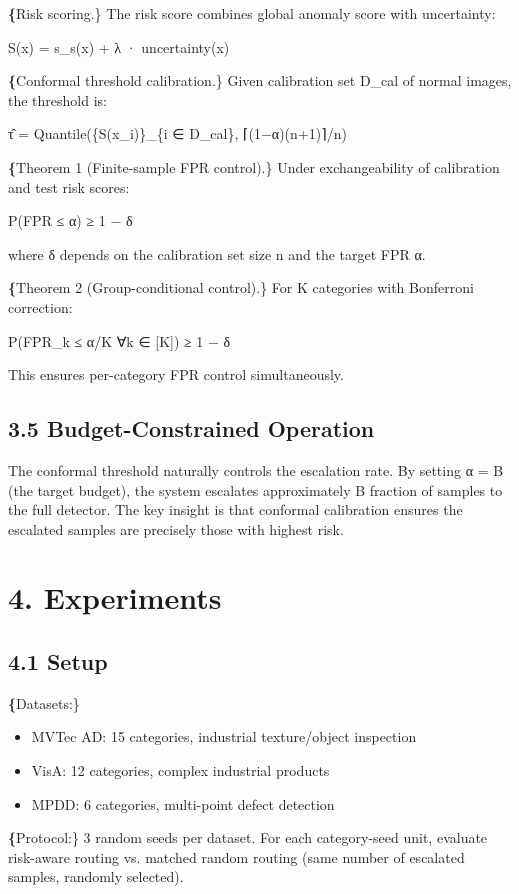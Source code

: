 \documentclass[10pt]{article}
\begin{document}
\textbf\{Risk scoring.\} The risk score combines global anomaly score with uncertainty:

S(x) = s\_s(x) + λ · uncertainty(x)

\textbf\{Conformal threshold calibration.\} Given calibration set D\_cal of normal images, the threshold is:

τ̂ = Quantile(\{S(x\_i)\}\_\{i ∈ D\_cal\}, ⌈(1−α)(n+1)⌉/n)

\textbf\{Theorem 1 (Finite-sample FPR control).\} Under exchangeability of calibration and test risk scores:

P(FPR ≤ α) ≥ 1 − δ

where δ depends on the calibration set size n and the target FPR α.

\textbf\{Theorem 2 (Group-conditional control).\} For K categories with Bonferroni correction:

P(FPR\_k ≤ α/K ∀k ∈ [K]) ≥ 1 − δ

This ensures per-category FPR control simultaneously.

\subsection{3.5 Budget-Constrained Operation}

The conformal threshold naturally controls the escalation rate. By setting α = B (the target budget), the system escalates approximately B fraction of samples to the full detector. The key insight is that conformal calibration ensures the escalated samples are precisely those with highest risk.

\section{4. Experiments}

\subsection{4.1 Setup}

\textbf\{Datasets:\}
\begin{itemize}
\item MVTec AD: 15 categories, industrial texture/object inspection
\item VisA: 12 categories, complex industrial products
\item MPDD: 6 categories, multi-point defect detection
\end{itemize}

\textbf\{Protocol:\} 3 random seeds per dataset. For each category-seed unit, evaluate risk-aware routing vs. matched random routing (same number of escalated samples, randomly selected).
\end{document}
